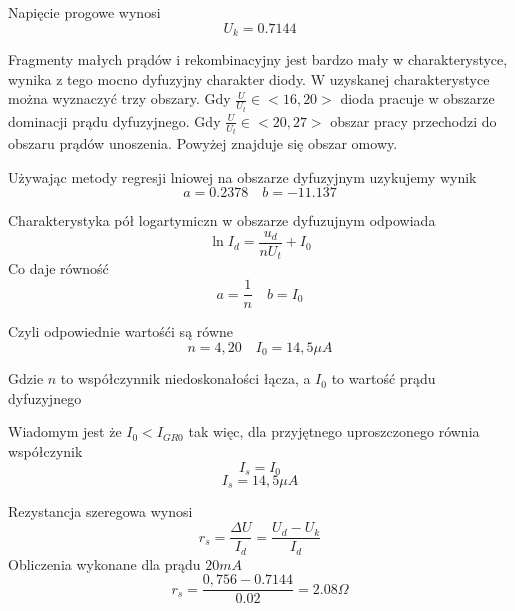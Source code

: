 \documentclass[11pt]{article}
\begin{document}
Napięcie progowe wynosi
$$ U_k =  0.7144 $$

Fragmenty małych prądów i rekombinacyjny jest bardzo mały w charakterystyce, wynika z tego mocno dyfuzyjny charakter diody.
W uzyskanej charakterystyce można wyznaczyć trzy obszary. Gdy $\frac{U}{U_t} \in <16,20>$ dioda pracuje w obszarze dominacji prądu dyfuzyjnego. Gdy $\frac{U}{U_t} \in <20,27>$ obszar pracy przechodzi do obszaru prądów unoszenia. Powyżej znajduje się obszar omowy.

Używając metody regresji lniowej na obszarze dyfuzyjnym uzykujemy wynik
$$ a =  0.2378 \quad b = -11.137 $$

Charakterystyka pół logartymiczn w obszarze dyfuzujnym odpowiada
$$ \ln{I_d} = \frac{u_d}{nU_t} + I_0$$
Co daje równość
$$ a = \frac{1}{n} \quad b = I_0 $$

Czyli odpowiednie wartośći są równe
$$ n = 4,20 \quad I_0 = 14,5 \mu A $$

Gdzie $n$ to współczynnik niedoskonałości łącza, a $I_0$ to wartość prądu dyfuzyjnego

Wiadomym jest że $ I_0 < I_{GR0} $ tak więc, dla przyjętnego uproszczonego równia współczynik 
$$ I_s = I_0 $$
$$ I_s = 14,5 \mu A $$

Rezystancja szeregowa wynosi
$$ r_s = \frac{\Delta U}{I_d} = \frac{U_d - U_k}{I_d} $$
Obliczenia wykonane dla prądu $20mA$
$$ r_s = \frac{0,756-0.7144}{0.02} = 2.08 \Omega $$
\end{document}
